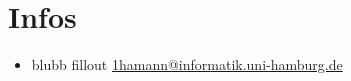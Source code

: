 \documentclass[12pt,a4paper]{scrreprt}
\begin{document}
%
%
%
%


\chapter*{Infos}
\begin{itemize}
\item blubb fillout \url{1hamann@informatik.uni-hamburg.de}
\end{itemize}






%
\end{document}
